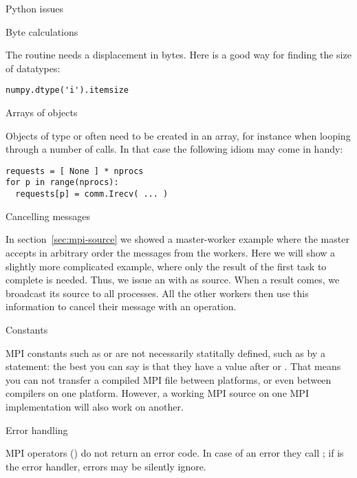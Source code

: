
 {Python issues}
\label{sec:python-stuff}

 {Byte calculations}

The  routine needs a displacement in
bytes. Here is a good way for finding the size of  datatypes:
\begin{verbatim}
numpy.dtype('i').itemsize
\end{verbatim}

 {Arrays of objects}

Objects of type  or  often need to be created
in an array, for instance when looping through a number of  calls.
In that case the following idiom may come in handy:
\begin{verbatim}
requests = [ None ] * nprocs
for p in range(nprocs):
  requests[p] = comm.Irecv( ... )
\end{verbatim}


 {Cancelling messages}

In section~\ref{sec:mpi-source} we showed a master-worker example where the 
master accepts in arbitrary order the messages from the workers.
Here we will show a slightly
more complicated example, where only the result of the first task to
complete is needed. Thus, we issue an 
with  as source.  When a result comes, we
broadcast its source to all processes.  All the other workers then use
this information to cancel their message with
an  operation.


 {Constants}

MPI constants such as  or  are not
necessarily statitally defined, such as by a  statement:
the best you can say is that they have a value after
 or .
That means you can not transfer a compiled MPI file between
platforms, or even between compilers on one platform.
However, a working MPI source on one MPI implementation
will also work on another.

 {Error handling}

MPI operators () do not return an error code. In case of
an error they call ; if 
is the error handler, errors may be silently ignore.

